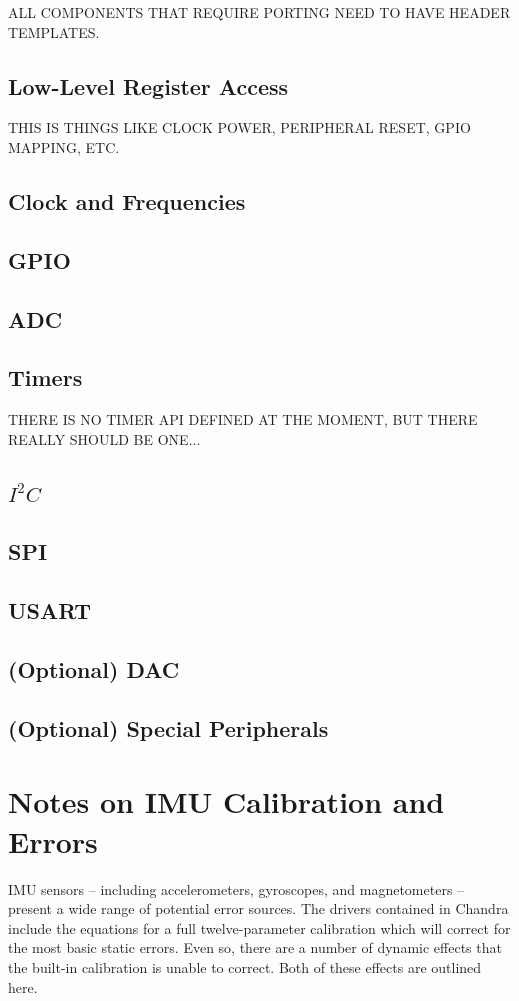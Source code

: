 \documentclass[10pt,letterpaper]{memoir} %
\newcommand{\iic}[0]{$I^{2}C$}
\begin{document}
ALL COMPONENTS THAT REQUIRE PORTING NEED TO HAVE HEADER TEMPLATES.
\section{Low-Level Register Access}
THIS IS THINGS LIKE CLOCK POWER, PERIPHERAL RESET, GPIO MAPPING, ETC.
\section{Clock and Frequencies}
\section{GPIO}
\section{ADC}
\section{Timers}
THERE IS NO TIMER API DEFINED AT THE MOMENT, BUT THERE REALLY SHOULD BE ONE...
\section{\iic}
\section{SPI}
\section{USART}

\section{(Optional) DAC}
\section{(Optional) Special Peripherals}

\chapter{Notes on IMU Calibration and Errors}
IMU sensors -- including accelerometers, gyroscopes, and magnetometers -- present a wide range of potential error sources.  The drivers contained in Chandra include the equations for a full twelve-parameter calibration which will correct for the most basic static errors.  Even so, there are a number of dynamic effects that the built-in calibration is unable to correct.  Both of these effects are outlined here.
\end{document}
